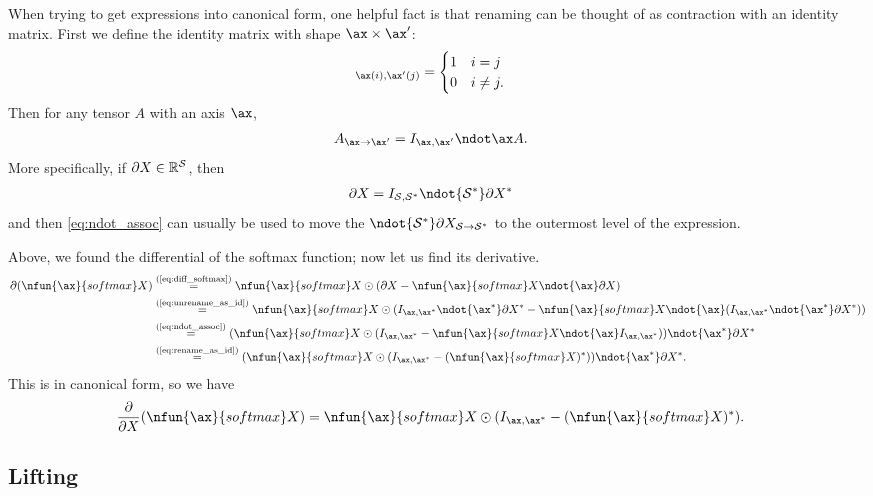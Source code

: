 When trying to get expressions into canonical form, one helpful fact is that
renaming can be thought of as contraction with an identity matrix. First we define the identity matrix with shape $\ax \times \ax'$:
\begin{align*}
[I_{\ax,\ax'}]_{\ax(i),\ax'(j)} &= \begin{cases} 1 & i = j \\ 0 & i \neq j. \end{cases}
\end{align*}
Then for any tensor $A$ with an axis $\ax$,
\begin{align}
A_{\ax\rightarrow\ax'} &= I_{\ax,\ax'} \ndot\ax A. 
\label{eq:rename_as_id}
\end{align}
More specifically, if $\partial X \in \mathbb{R}^\mathcal{S}$, then
\begin{align}
\partial X &= I_{\mathcal{S},\mathcal{S}\inax} \ndot{\mathcal{S}\inax} \partial X\inax \label{eq:unrename_as_id}
\end{align}
and then \cref{eq:ndot_assoc} can usually be used to move the ${}\ndot{\mathcal{S}\inax} \partial X_{\mathcal{S}\rightarrow\mathcal{S}\inax}$ to the outermost level of the expression.

Above, we found the differential of the softmax function; now let us find its derivative.
\begin{align*}
\partial (\nfun{\ax}{softmax} X) 
&\eqby{eq:diff_softmax} \nfun{\ax}{softmax} X \odot (\partial X - \nfun{\ax}{softmax} X \ndot{\ax} \partial X) \\
&\eqby{eq:unrename_as_id} \nfun{\ax}{softmax} X \odot (I_{\ax,\ax\inax} \ndot{\ax\inax} \partial X\inax - \nfun{\ax}{softmax} X \ndot{\ax} (I_{\ax,\ax\inax} \ndot{\ax\inax} \partial X\inax)) \\
&\eqby{eq:ndot_assoc} (\nfun{\ax}{softmax} X \odot (I_{\ax,\ax\inax} - \nfun{\ax}{softmax} X \ndot{\ax} I_{\ax,\ax\inax})) \ndot{\ax\inax} \partial X\inax \\
&\eqby{eq:rename_as_id} (\nfun{\ax}{softmax} X \odot (I_{\ax,\ax\inax} - (\nfun{\ax}{softmax} X)\inax)) \ndot{\ax\inax} \partial X\inax.
\end{align*}
This is in canonical form, so we have
\begin{align}
\frac{\partial}{\partial X} (\nfun{\ax}{softmax} X) &= \nfun{\ax}{softmax} X \odot (I_{\ax,\ax\inax} - (\nfun{\ax}{softmax} X)\inax). \label{eq:deriv_softmax}
\end{align}

\subsection{Lifting}


